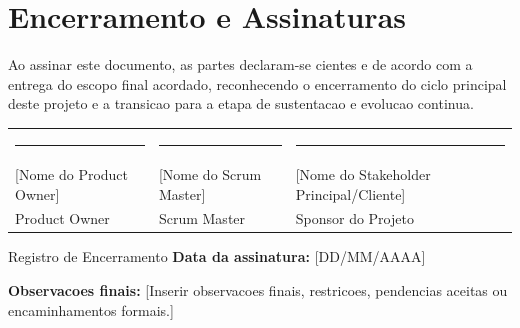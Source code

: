 \documentclass[12pt,a4paper]{article}
\newcommand{\placeholder}[1]{\textcolor{MediumGray}{[#1]}}
\begin{document}
\section{Encerramento e Assinaturas}

Ao assinar este documento, as partes declaram-se cientes e de acordo com a entrega do escopo final acordado, reconhecendo o encerramento do ciclo principal deste projeto e a transicao para a etapa de sustentacao e evolucao continua.

\vspace{1.2cm}

\begin{table}[H]
  \centering
  \begin{tabularx}{\textwidth}{@{}C{0.31\textwidth}C{0.31\textwidth}C{0.31\textwidth}@{}}
    \rule{0.29\textwidth}{0.4pt} & \rule{0.29\textwidth}{0.4pt} & \rule{0.29\textwidth}{0.4pt} \\
    \placeholder{Nome do Product Owner} & \placeholder{Nome do Scrum Master} & \placeholder{Nome do Stakeholder Principal/Cliente} \\
    Product Owner & Scrum Master & Sponsor do Projeto \\
  \end{tabularx}
\end{table}

\vspace{1.2cm}

\begin{notebox}{Registro de Encerramento}
  \textbf{Data da assinatura:} \placeholder{DD/MM/AAAA}

  \textbf{Observacoes finais:} \placeholder{Inserir observacoes finais, restricoes, pendencias aceitas ou encaminhamentos formais.}
\end{notebox}
\end{document}
